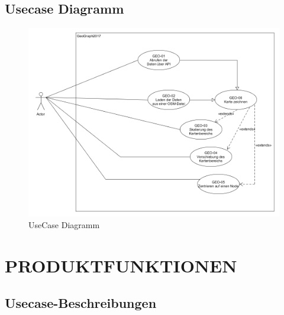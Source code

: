 	\subsection{Usecase Diagramm}
		\begin{figure}[H]
			\centering
			\includegraphics[width=0.7\linewidth]{images/Usecases}
			\caption{UseCase Diagramm}
			\label{fig:Usecase Diagramm}
		\end{figure}
		
		
	\section{\Large PRODUKTFUNKTIONEN}
	\subsection{Usecase-Beschreibungen}

